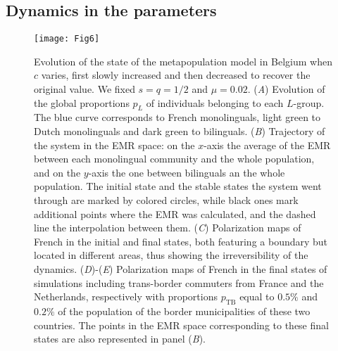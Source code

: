 \documentclass[../thesis.tex]{subfiles}
\begin{document}
\subsection{Dynamics in the parameters}
\begin{figure}
\centering
    \texttt{[image: Fig6]}
    \caption{Evolution of the state of the metapopulation model in Belgium when $c$
    varies, first slowly increased and then decreased to recover the original value. We
    fixed $s=q=1/2$ and $\mu=0.02$. (\textit{A}) Evolution of the global proportions
    $p_L$ of individuals belonging to each $L$-group. The blue curve corresponds to
    French monolinguals, light green to Dutch monolinguals and dark green to bilinguals.
    (\textit{B}) Trajectory of the system in the EMR space: on the $x$-axis the average
    of the EMR between each monolingual community and the whole population, and on the
    $y$-axis the one between bilinguals an the whole population. The initial state and
    the stable states the system went through are marked by colored circles, while black
    ones mark additional points where the EMR was calculated, and the dashed line the
    interpolation between them. (\textit{C}) Polarization maps of French in the initial
    and final states, both featuring a boundary but located in different areas, thus
    showing the irreversibility of the dynamics. (\textit{D})-(\textit{E}) Polarization
    maps of French in the final states of simulations including trans-border commuters
    from France and the Netherlands, respectively with proportions $p_{\text{TB}}$ equal
    to $0.5\%$ and $0.2\%$ of the population of the border municipalities of these two
    countries. The points in the EMR space corresponding to these final states are also
    represented in panel (\textit{B}).}
    \label{fig:varying_c_sep_to_mix_to_sep}
\end{figure}
    
\end{document}
